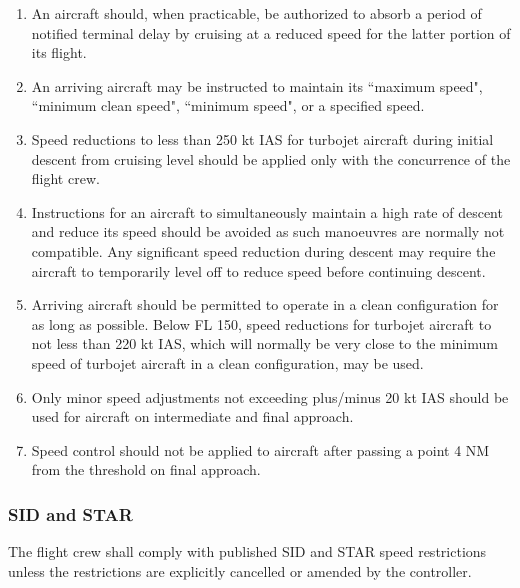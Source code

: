 \documentclass[../vATM.tex]{subfiles}
\begin{document}
    \begin{enumerate}
        \item An aircraft should, when practicable, be authorized to absorb a period of notified terminal delay by cruising at a reduced speed for the latter portion of its flight.
        \item An arriving aircraft may be instructed to maintain its ``maximum speed", ``minimum clean speed", ``minimum speed", or a specified speed.
        \item Speed reductions to less than 250 kt IAS for turbojet aircraft during initial descent from cruising level should be applied only with the concurrence of the flight crew.
        \item Instructions for an aircraft to simultaneously maintain a high rate of descent and reduce its speed should be avoided as such manoeuvres are normally not compatible. Any significant speed reduction during descent may require the aircraft to temporarily level off to reduce speed before continuing descent.
        \item Arriving aircraft should be permitted to operate in a clean configuration for as long as possible. Below FL 150, speed reductions for turbojet aircraft to not less than 220 kt IAS, which will normally be very close to the minimum speed of turbojet aircraft in a clean configuration, may be used.
        \item Only minor speed adjustments not exceeding plus/minus 20 kt IAS should be used for aircraft on intermediate and final approach.
        \item Speed control should not be applied to aircraft after passing a point 4 NM from the threshold on final approach.
    \end{enumerate}

    \subsubsection{SID and STAR}

    The flight crew shall comply with published SID and STAR speed restrictions unless the restrictions are explicitly cancelled or amended by the controller.
\end{document}
